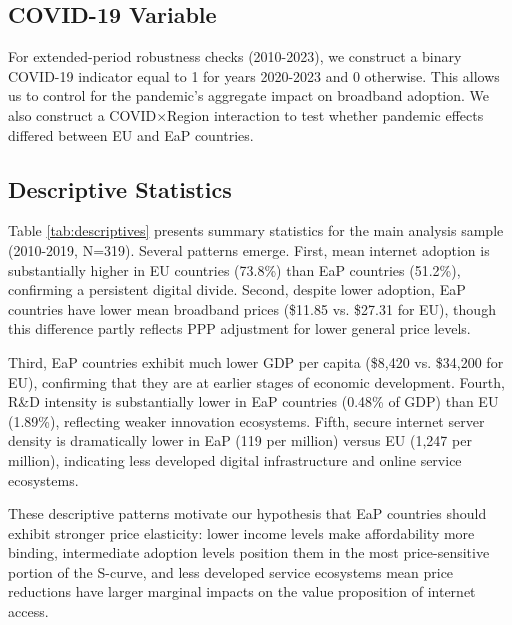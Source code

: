 \documentclass[12pt,review]{elsarticle}
\begin{document}
\subsection{COVID-19 Variable}

For extended-period robustness checks (2010-2023), we construct a binary COVID-19 indicator equal to 1 for years 2020-2023 and 0 otherwise. This allows us to control for the pandemic's aggregate impact on broadband adoption. We also construct a COVID$\times$Region interaction to test whether pandemic effects differed between EU and EaP countries.

\subsection{Descriptive Statistics}

Table \ref{tab:descriptives} presents summary statistics for the main analysis sample (2010-2019, N=319). Several patterns emerge. First, mean internet adoption is substantially higher in EU countries (73.8\%) than EaP countries (51.2\%), confirming a persistent digital divide. Second, despite lower adoption, EaP countries have lower mean broadband prices (\$11.85 vs. \$27.31 for EU), though this difference partly reflects PPP adjustment for lower general price levels.

Third, EaP countries exhibit much lower GDP per capita (\$8,420 vs. \$34,200 for EU), confirming that they are at earlier stages of economic development. Fourth, R\&D intensity is substantially lower in EaP countries (0.48\% of GDP) than EU (1.89\%), reflecting weaker innovation ecosystems. Fifth, secure internet server density is dramatically lower in EaP (119 per million) versus EU (1,247 per million), indicating less developed digital infrastructure and online service ecosystems.

These descriptive patterns motivate our hypothesis that EaP countries should exhibit stronger price elasticity: lower income levels make affordability more binding, intermediate adoption levels position them in the most price-sensitive portion of the S-curve, and less developed service ecosystems mean price reductions have larger marginal impacts on the value proposition of internet access.
\end{document}
